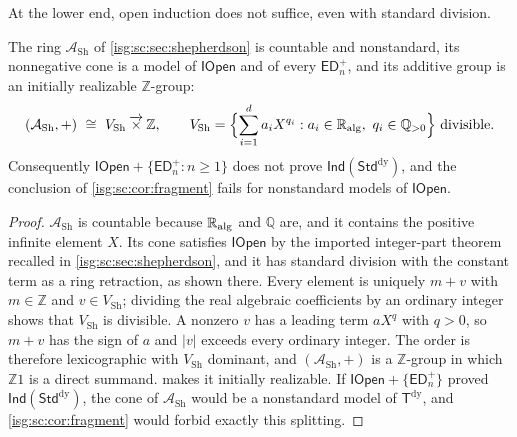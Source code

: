 \documentclass[11pt]{article}
\theoremstyle{definition}
\theoremstyle{remark}
\newcommand{\R}{\mathbb{R}}
\newcommand{\Z}{\mathbb{Z}}
\newcommand{\lex}{\mathbin{\overrightarrow{\times}}}
\newcommand{\Q}{\mathbb{Q}}
\newcommand{\StdDy}{\mathsf{Std}^{\mathrm{dy}}}
\newcommand{\Tdy}{\mathsf{T}^{\mathrm{dy}}}
\newcommand{\Ind}{\mathsf{Ind}}
\newcommand{\ED}{\mathsf{ED}}
\newcommand{\Iopen}{\mathsf{IOpen}}
\newcommand{\Asc}{\mathcal{A}}
\begin{document}
At the lower end, open induction does not suffice, even with standard
division.

\begin{proposition}\label{isg:sc:prop:iopen}
The ring $\Asc_{\mathrm{Sh}}$ of \cref{isg:sc:sec:shepherdson} is countable
and nonstandard, its nonnegative cone is a model of $\Iopen$ and of every
$\ED_n^+$, and its additive group is an initially realizable $\Z$-group:
\[
 (\Asc_{\mathrm{Sh}},+)\ \cong\ V_{\mathrm{Sh}}\lex\Z,\qquad
 V_{\mathrm{Sh}}=\Bigl\{\sum_{i=1}^d a_iX^{q_i}:a_i\in\R_{\rm alg},\
 q_i\in\Q_{>0}\Bigr\}\ \text{divisible}.
\]
Consequently $\Iopen+\{\ED_n^+:n\ge1\}$ does not prove $\Ind(\StdDy)$,
and the conclusion of \cref{isg:sc:cor:fragment} fails for nonstandard
models of $\Iopen$.
\end{proposition}
\begin{proof}
$\Asc_{\mathrm{Sh}}$ is countable because $\R_{\rm alg}$ and $\Q$ are, and
it contains the positive infinite element $X$. Its cone satisfies $\Iopen$
by the imported integer-part theorem recalled in
\cref{isg:sc:sec:shepherdson}, and it has standard division with the
constant term as a ring retraction, as shown there. Every element is
uniquely $m+v$ with $m\in\Z$ and $v\in V_{\mathrm{Sh}}$; dividing the
real algebraic coefficients by an ordinary integer shows that
$V_{\mathrm{Sh}}$ is divisible. A nonzero $v$ has a leading term
$aX^{q}$ with $q>0$, so $m+v$ has the sign of $a$ and $|v|$ exceeds every
ordinary integer. The order is therefore lexicographic with
$V_{\mathrm{Sh}}$ dominant, and $(\Asc_{\mathrm{Sh}},+)$ is a $\Z$-group in
which $\Z1$ is a direct summand. \Cref{isg:cf:main:presburger} makes it
initially realizable. If $\Iopen+\{\ED_n^+\}$ proved $\Ind(\StdDy)$, the
cone of $\Asc_{\mathrm{Sh}}$ would be a nonstandard model of $\Tdy$, and
\cref{isg:sc:cor:fragment} would forbid exactly this splitting.
\end{proof}
\end{document}
